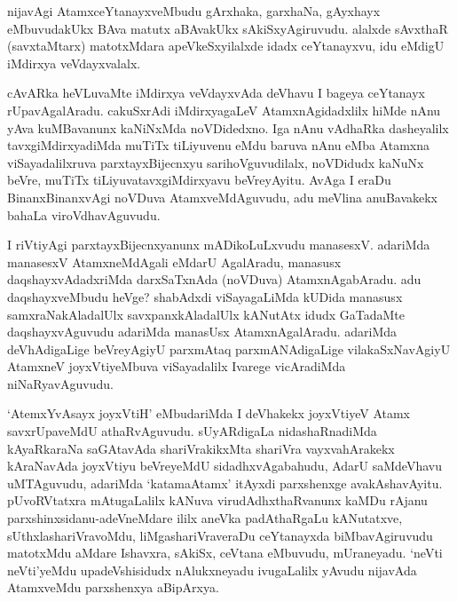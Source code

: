 \begin{artha}
nijavAgi AtamxceYtanayxveMbudu gArxhaka, garxhaNa, gAyxhayx eMbuvudakUkx BAva matutx aBAvakUkx sAkiSxyAgiruvudu. alalxde sAvxthaR (savxtaMtarx) matotxMdara apeVkeSxyilalxde idadx ceYtanayxvu, idu eMdigU iMdirxya veVdayxvalalx. 
\end{artha}


\begin{artha}
cAvARka heVLuvaMte iMdirxya veVdayxvAda deVhavu I bageya ceYtanayx rUpavAgalAradu. cakuSxrAdi iMdirxyagaLeV AtamxnAgidadxlilx hiMde nAnu yAva kuMBavanunx kaNiNxMda noVDidedxno. Iga nAnu vAdhaRka dasheyalilx tavxgiMdirxyadiMda muTiTx tiLiyuvenu eMdu baruva nAnu eMba Atamxna viSayadalilxruva parxtayxBijecnxyu sarihoVguvudilalx, noVDidudx kaNuNx beVre, muTiTx tiLiyuvatavxgiMdirxyavu beVreyAyitu. AvAga I eraDu BinanxBinanxvAgi noVDuva AtamxveMdAguvudu, adu meVlina anuBavakekx bahaLa viroVdhavAguvudu.  
\end{artha}


\begin{artha}
I riVtiyAgi parxtayxBijecnxyanunx mADikoLuLxvudu manasesxV. adariMda manasesxV AtamxneMdAgali eMdarU AgalAradu, manasusx daqshayxvAdadxriMda darxSaTxnAda (noVDuva) AtamxnAgabAradu. adu daqshayxveMbudu heVge? shabAdxdi viSayagaLiMda kUDida manasusx samxraNakAladalUlx savxpanxkAladalUlx kANutAtx idudx GaTadaMte daqshayxvAguvudu adariMda manasUsx AtamxnAgalAradu. adariMda deVhAdigaLige beVreyAgiyU parxmAtaq parxmANAdigaLige vilakaSxNavAgiyU AtamxneV joyxVtiyeMbuva viSayadalilx Ivarege vicAradiMda niNaRyavAguvudu.
\end{artha}


\begin{artha}
`AtemxYvAsayx joyxVtiH' eMbudariMda I deVhakekx joyxVtiyeV Atamx savxrUpaveMdU athaRvAguvudu. sUyARdigaLa nidashaRnadiMda kAyaRkaraNa saGAtavAda shariVrakikxMta shariVra vayxvahArakekx kAraNavAda joyxVtiyu beVreyeMdU sidadhxvAgabahudu, AdarU saMdeVhavu uMTAguvudu, adariMda `katamaAtamx' itAyxdi parxshenxge avakAshavAyitu. pUvoRVtatxra mAtugaLalilx kANuva virudAdhxthaRvanunx kaMDu rAjanu parxshinxsidanu-adeVneMdare ililx aneVka padAthaRgaLu kANutatxve, sUthxlashariVravoMdu, liMgashariVraveraDu ceYtanayxda biMbavAgiruvudu matotxMdu aMdare Ishavxra, sAkiSx, ceVtana eMbuvudu, mUraneyadu. `neVti neVti'yeMdu upadeVshisidudx nAlukxneyadu ivugaLalilx yAvudu nijavAda AtamxveMdu parxshenxya aBipArxya. 
\end{artha}

